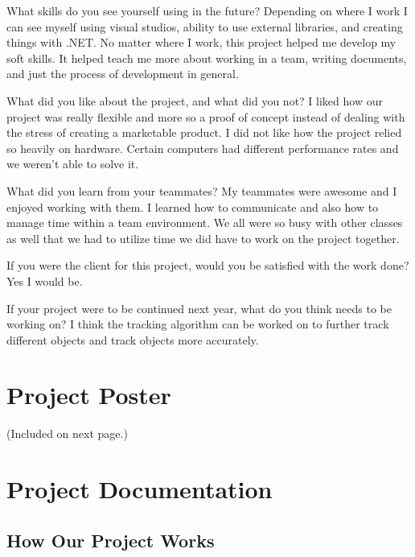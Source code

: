 \documentclass[onecolumn, draftclsnofoot,10pt, compsoc]{IEEEtran}
\begin{document}
What skills do you see yourself using in the future? Depending on where I work I can see myself using visual studios, ability to use external libraries, and creating things with .NET. No matter where I work, this project helped me develop my soft skills. It helped teach me more about working in a team, writing documents, and just the process of development in general.

What did you like about the project, and what did you not? I liked how our project was really flexible and more so a proof of concept instead of dealing with the stress of creating a marketable product. I did not like how the project relied so heavily on hardware. Certain computers had different performance rates and we weren't able to solve it.

What did you learn from your teammates? My teammates were awesome and I enjoyed working with them. I learned how to communicate and also how to manage time within a team environment. We all were so busy with other classes as well that we had to utilize time we did have to work on the project together.

If you were the client for this project, would you be satisfied with the work done? Yes I would be.

If your project were to be continued next year, what do you think needs to be working on? I think the tracking algorithm can be worked on to further track different objects and track objects more accurately.

\section{Project Poster}
(Included on next page.)


\newpage
\section{Project Documentation}

\subsection{How Our Project Works}
\end{document}
